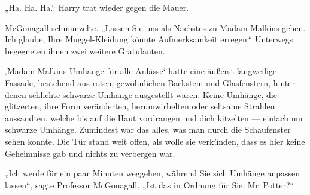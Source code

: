 „Ha. Ha. Ha.“ Harry trat wieder gegen die Mauer.

McGonagall schmunzelte.
„Lassen Sie uns als Nächstes zu Madam Malkins gehen. Ich glaube, Ihre Muggel-Kleidung könnte Aufmerksamkeit erregen.“
Unterwegs begegneten ihnen zwei weitere Gratulanten.

‚Madam Malkins Umhänge für alle Anlässe‘ hatte eine äußerst langweilige Fassade, bestehend aus roten, gewöhnlichen Backstein und Glasfenstern, hinter denen schlichte schwarze Umhänge ausgestellt waren. Keine Umhänge, die glitzerten, ihre Form veränderten, herumwirbelten oder seltsame Strahlen aussandten, welche bis auf die Haut vordrangen und dich kitzelten — einfach nur schwarze Umhänge. Zumindest war das alles, was man durch die Schaufenster sehen konnte. Die Tür stand weit offen, als wolle sie verkünden, dass es hier keine Geheimnisse gab und nichts zu verbergen war.

„Ich werde für ein paar Minuten weggehen, während Sie sich Umhänge anpassen lassen“, sagte Professor McGonagall.
„Ist das in Ordnung für Sie, Mr~Potter?“

